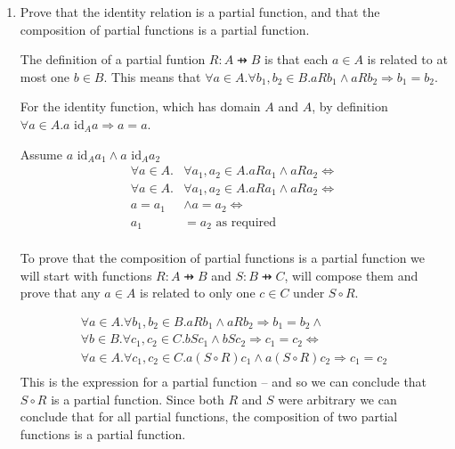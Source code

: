 \documentclass[10pt,\jkfside,a4paper]{article}
\begin{document}
\begin{enumerate}
\item Prove that the identity relation is a partial function, and that the composition of partial functions 
is a partial function.

The definition of a partial funtion $R: A \pfun B$ is that each $a \in A$ is related to at most one $b \in B$. 
This means that $\forall a \in A. \forall b_1, b_2 \in B. a R b_1 \wedge a R b_2 \Longrightarrow b_1 = b_2$.

For the identity function, which has domain $A$ and $A$, by definition $\forall a \in A. a \text{ id}_A a 
\Longrightarrow a = a$. 

Assume $a \text{ id}_A a_1 \wedge a \text{ id}_A a_2$
\begin{equation}
\begin{split}
\forall a \in A. &\forall a_1, a_2 \in A. a R a_1 \wedge a R a_2 \Longleftrightarrow \\
\forall a \in A. &\forall a_1, a_2 \in A. a R a_1 \wedge a R a_2 \Longleftrightarrow \\
a = a_1 &\wedge a = a_2 \Longleftrightarrow \\
a_1 &= a_2 \text{ as required} \\
\end{split}
\end{equation}

To prove that the composition of partial functions is a partial function we will start with functions 
$R: A \pfun B$ and $S: B \pfun C$, will compose them and prove that any $a \in A$ is related to only 
one $c \in C$ under $S \circ R$.

\begin{equation}
\begin{split}
\forall a \in A. \forall b_1, b_2 \in B. a R b_1 \wedge a R b_2 \Longrightarrow b_1 = b_2 \wedge \\
\forall b \in B. \forall c_1, c_2 \in C. b S c_1 \wedge b S c_2 \Longrightarrow c_1 = c_2 \Longleftrightarrow \\
\forall a \in A. \forall c_1, c_2 \in C. a (S \circ R) c_1 \wedge a (S \circ R) c_2 \Longrightarrow c_1 = c_2 \\
\end{split}
\end{equation}
This is the expression for a partial function -- and so we can conclude that $S \circ R$ is a partial function. 
Since both $R$ and $S$ were arbitrary we can conclude that for all partial functions, the composition of two 
partial functions is a partial function.

\end{enumerate}
\end{document}
